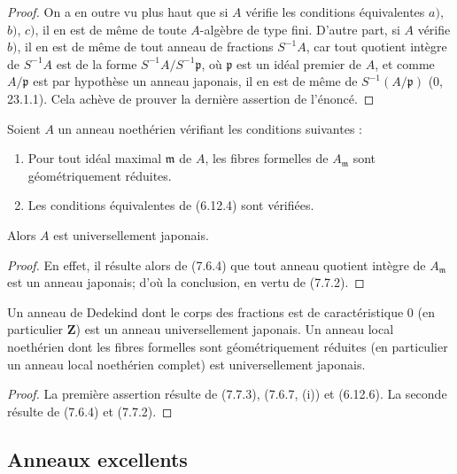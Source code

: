 \begin{proof}
On a en outre vu plus haut que si $A$ vérifie les conditions équivalentes
$a)$, $b)$, $c)$, il en est de même de toute $A$-algèbre de type fini. D'autre
part, si $A$ vérifie $b)$, il en est de même de tout anneau de fractions
$S^{-1}A$, car tout quotient intègre de $S^{-1}A$ est de la forme
$S^{-1}A/S^{-1}\mathfrak p$, où $\mathfrak p$ est un idéal premier de $A$, et
comme $A/\mathfrak p$ est par hypothèse un anneau japonais, il en est de même
de $S^{-1}(A/\mathfrak p)$ (0, 23.1.1). Cela achève de prouver la dernière
assertion de l'énoncé.
\end{proof}

\begin{corollary}[7.7.3]
\label{IV.2.s7.7.3-fr}
Soient $A$ un anneau noethérien vérifiant les conditions suivantes :
\begin{enumerate}
\item[\emph{(i)}] Pour tout idéal maximal $\mathfrak m$ de $A$, les fibres
formelles de $A_{\mathfrak m}$ sont géométriquement réduites.
\item[\emph{(ii)}] Les conditions équivalentes de (6.12.4) sont vérifiées.
\end{enumerate}
Alors $A$ est universellement japonais.
\end{corollary}

\begin{proof}
En effet, il résulte alors de (7.6.4) que tout anneau quotient intègre de
$A_{\mathfrak m}$ est un anneau japonais; d'où la conclusion, en vertu de
(7.7.2).
\end{proof}

\begin{corollary}[7.7.4]
\label{IV.2.s7.7.4-fr}
Un anneau de Dedekind dont le corps des fractions est de caractéristique 0 (en
particulier $\mathbf Z$) est un anneau universellement japonais. Un anneau
local noethérien dont les fibres formelles sont géométriquement réduites (en
particulier un anneau local noethérien complet) est universellement japonais.
\end{corollary}

\begin{proof}
La première assertion résulte de (7.7.3), (7.6.7, (i)) et (6.12.6). La seconde
résulte de (7.6.4) et (7.7.2).
\end{proof}

\subsection{Anneaux excellents}
\label{IV.2.ss7.8-fr}

